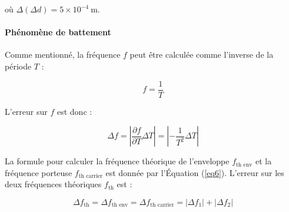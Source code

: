 \documentclass[a4paper, 12pt,oneside]{article}
\begin{document}
où \( \Delta (\Delta d) = 5 \times 10^{-4} \ \text{m} \).

\paragraph{Phénomène de battement}

Comme mentionné, la fréquence \( f \) peut être calculée comme l'inverse de la période \( T \) :

\begin{equation}
f = \frac{1}{T}
\end{equation}

L'erreur sur \( f \) est donc :

\begin{equation}
\Delta f = \left| \frac{\partial f}{\partial T} \Delta T \right| = \left| -\frac{1}{T^2} \Delta T \right|
\end{equation}

La formule pour calculer la fréquence théorique de l'enveloppe \( f_{\text{th env}} \) et la fréquence porteuse \( f_{\text{th carrier}} \) est donnée par l'Équation (\ref{eq6}). L'erreur sur les deux fréquences théoriques \( f_{\text{th}} \) est :

\begin{equation}
\Delta f_{\text{th}} = \Delta f_{\text{th env}} = \Delta f_{\text{th carrier}} = |\Delta f_1| + |\Delta f_2|
\end{equation}
\end{document}
